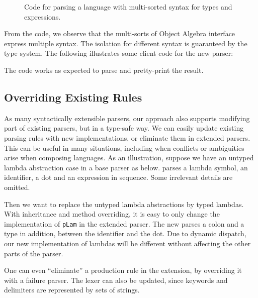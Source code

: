 \begin{figure}[ht]
\caption{Code for parsing a language with multi-sorted syntax for types and expressions.}
\label{fig:multi}
\end{figure}

From the code, we observe that the multi-sorts of Object Algebra interface
express multiple syntax. The isolation for different syntax
is guaranteed by the type system. The following illustrates some client code
for the new parser:

The code works as expected to parse and pretty-print the result.

\subsection{Overriding Existing Rules}\label{subsec:overriding-rules}

As many syntactically extensible parsers, our approach also supports
modifying part of existing parsers, but in a type-safe way. We can
easily update existing parsing rules with new implementations, or
eliminate them in extended parsers. This can be useful in many
situations, including when conflicts or ambiguities arise when
composing languages.
As an illustration, suppose we have an untyped lambda abstraction case in a base parser as below.  parses a lambda symbol, an identifier, a dot and an expression in sequence. Some irrelevant details are omitted.


Then we want to replace the untyped lambda abstractions by typed
lambdas. With inheritance and method overriding, it is easy to only
change the implementation of \lstinline{pLam} in the extended parser.
The new  parses a colon and a type in addition,
between the identifier and the dot. Due to dynamic dispatch, our new
implementation of lambdas will be different without affecting the other parts of the parser.



One can even ``eliminate'' a production rule in the extension, by overriding it with a failure parser. The lexer can also be updated, since keywords and delimiters are represented by sets of strings.


